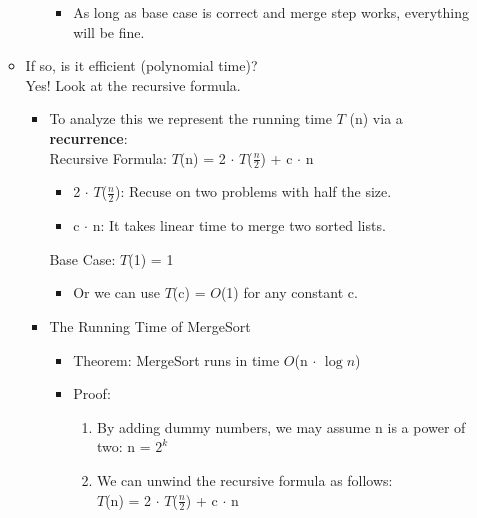 \documentclass[12pt]{article}
\begin{document}
\begin{itemize}
\begin{itemize}
\begin{itemize}
\begin{itemize}
			\item As long as base case is correct and merge step works, everything will be fine.
			\end{itemize}
		\end{itemize}
	\item If so, is it efficient (polynomial time)?\\
	\noindent Yes! Look at the recursive formula.
		\begin{itemize}
		\item To analyze this we represent the running time $T$ (n) via a \textbf{recurrence}:\\
		\hspace*{\fill}\large{Recursive Formula: $T$(n) = 2 $\cdot$ $T$($\frac{n}{2}$) + c $\cdot$ n}\hspace*{\fill} 
			\begin{itemize}
			\item 2 $\cdot$ $T$($\frac{n}{2}$): Recuse on two problems with half the size.
			\item c $\cdot$ n: It takes linear time to merge two sorted lists.
			\end{itemize}
		\hspace*{\fill}\large{Base Case: $T$(1) = 1}\hspace*{\fill} 
			\begin{itemize}
			\item Or we can use $T$(c) = $O$(1) for any constant c.
			\end{itemize}
		\item The Running Time of MergeSort
			\begin{itemize}
			\item Theorem: MergeSort runs in time $O$(n $\cdot$ $\log{}n$)
			\item Proof: 
				\begin{enumerate}
				\item By adding dummy numbers, we may assume n is a power of two: n = 						$2^k$
				\item We can unwind the recursive formula as follows:\\
				\hspace*{\fill}\large{$T$(n) = 2 $\cdot$ $T$($\frac{n}{2}$) + c $\cdot$ n}\hspace*{\fill}
				\begin{center}

\end{center}
\end{enumerate}
\end{itemize}
\end{itemize}
\end{itemize}
\end{itemize}
\end{document}
